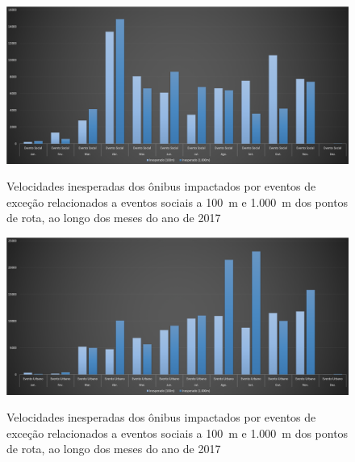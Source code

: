 \documentclass[
	12pt,				%
	oneside,			%
	a4paper,			%
	english,			%
	brazil				%
	]{abntex2ppgsi}
\begin{document}
{{{\begin{figure}[!htb]
	\centering
 	  \caption{Velocidades inesperadas dos ônibus impactados por eventos de exceção relacionados a eventos sociais a 100~m e 1.000~m dos pontos de rota, ao longo dos meses do ano de 2017}
		\includegraphics[width=1\linewidth]{images/apriori_analysis_shapes_social_events.png}
	\label{fig:apriori_analysis_shapes_social_events}
\end{figure}

\begin{figure}[!htb]
	\centering
 	  \caption{Velocidades inesperadas dos ônibus impactados por eventos de exceção relacionados a eventos sociais a 100~m e 1.000~m dos pontos de rota, ao longo dos meses do ano de 2017}
		\includegraphics[width=1\linewidth]{images/apriori_analysis_shapes_urban_events.png}
	\label{fig:apriori_analysis_shapes_urban_events}
\end{figure}



}}}
\end{document}
